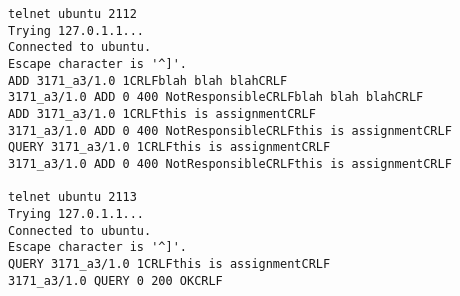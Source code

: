 \documentclass[11pt,a4paper,titlepage]{article}
\begin{document}
\begin{verbatim}
telnet ubuntu 2112
Trying 127.0.1.1...
Connected to ubuntu.
Escape character is '^]'.
ADD 3171_a3/1.0 1CRLFblah blah blahCRLF
3171_a3/1.0 ADD 0 400 NotResponsibleCRLFblah blah blahCRLF
ADD 3171_a3/1.0 1CRLFthis is assignmentCRLF
3171_a3/1.0 ADD 0 400 NotResponsibleCRLFthis is assignmentCRLF
QUERY 3171_a3/1.0 1CRLFthis is assignmentCRLF
3171_a3/1.0 ADD 0 400 NotResponsibleCRLFthis is assignmentCRLF

telnet ubuntu 2113
Trying 127.0.1.1...
Connected to ubuntu.
Escape character is '^]'.
QUERY 3171_a3/1.0 1CRLFthis is assignmentCRLF
3171_a3/1.0 QUERY 0 200 OKCRLF

\end{verbatim}
\end{document}
